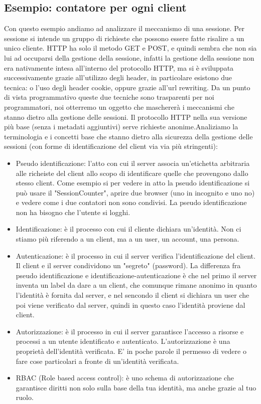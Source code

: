 \subsection{Esempio: contatore per ogni client}
Con questo esempio andiamo ad analizzare il meccanismo di una sessione. Per sessione si intende un gruppo di richieste che possono essere fatte risalire a un unico cliente. HTTP ha solo il metodo GET e POST, e quindi sembra che non sia lui ad occuparsi della gestione della sessione, infatti la gestione della sessione non era nativamente intesa all'interno del protocollo HTTP, ma si è sviluppata successivamente grazie all'utilizzo degli header, in particolare esistono due tecnica: o l'uso degli header cookie, oppure grazie all'url rewriting.\newline
Da un punto di vista programmativo queste due tecniche sono trasparenti per noi programmatori, noi otterremo un oggetto che maschererà i meccanismi che stanno dietro alla gestione delle sessioni.\newline
\newline
Il protocollo HTTP nella sua versione più base (senza i metadati aggiuntivi) serve richieste anonime. Analiziamo la terminologia e i concetti base che stanno dietro alla sicurezza della gestione delle sessioni (con forme di identificazione del client via via più stringenti):
\begin{itemize}
    \item Pseudo identificazione: l'atto con cui il server associa un'etichetta arbitraria alle richeiste del client allo scopo di identificare quelle che provengono dallo stesso client. Come esempio si per vedere in atto la pseudo identificazione si può usare il "SessionCounter", aprire due browser (uno in incognito e uno no) e vedere come i due contatori non sono condivisi. La pseudo identificazione non ha bisogno che l'utente si logghi.
    \item Identificazione: è il processo con cui il cliente dichiara un'identità. Non ci stiamo più riferendo a un client, ma a un user, un account, una persona.
    \item Autenticazione: è il processo in cui il server verifica l'identificazione del client. Il client e il server condividono un "segreto" (password). La differenza fra pseudo identificazione e identificazione-autenticazione è che nel primo il server inventa un label da dare a un client, che comunque rimane anonimo in quanto l'identità è fornita dal server, e nel sencondo il client si dichiara un user che poi viene verificato dal server, quindi in questo caso l'identità proviene dal client.
    \item Autorizzazione: è il processo in cui il server garantisce l'accesso a risorse e processi a un utente identificato e autenticato. L'autorizzazione è una proprietà dell'identità verificata. E' in poche parole il permesso di vedere o fare cose particolari a fronte di un'identità verificata.
    \item RBAC (Role based access control): è uno schema di autorizzazione che garantisce diritti non solo sulla base della tua identità, ma anche grazie al tuo ruolo.
\end{itemize}